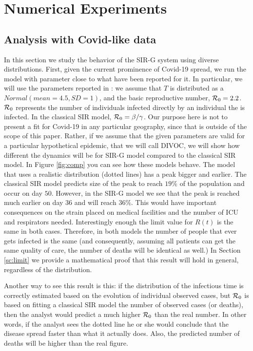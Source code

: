\documentclass[USenglish,10pt]{article}
\newcommand{\Ro}{\ensuremath\mathcal{R}_0\xspace}
\begin{document}
\section{Numerical Experiments}\label{sc:numerical}

\subsection{Analysis with Covid-like data}

In this section we study the behavior of the SIR-G system using diverse distributions.
First, given the current prominence of Covid-19 spread, we run the model with parameter close to what have been reported for it. In particular, we will use the parameters reported in \cite{lour.ea20}: we assume that $T$ is distributed as a $Normal(mean=4.5, SD=1)$, and the basic reproductive number, $\Ro=2.2$.
$\Ro$ represents the number of individuals infected directly by an individual the is infected. In the classical SIR model, $\Ro=\beta/\gamma$.
Our purpose here is not to present a fit for Covid-19 in any particular geography, since that is outside of the scope of this paper.
Rather, if we assume that the given parameters are valid for a particular hypothetical epidemic, that we will call DIVOC, we will show how different the dynamics will be for SIR-G model compared to the classical SIR model.
In Figure \ref{fig:comp} you can see how these models behave. The model that uses a realistic distribution (dotted lines) has a peak bigger and earlier. The classical SIR model predicts size of the peak to reach $19\%$ of the population and occur on day $50$.
However, in the SIR-G model we see that the peak is reached much earlier on day $36$ and will reach $36\%$. This would have important consequences on the strain placed on medical facilities and the number of ICU and respirators needed.
Interestingly enough the limit value for $R(t)$ is the same in both cases. Therefore, in both models the number of people that ever gets infected is the same (and consequently, assuming all patients can get the same quality of care, the number of deaths will be identical as well.) In Section \ref{sc:limit} we provide a mathematical proof that this result will hold in general, regardless of the distribution.

Another way to see this result is this: if the distribution of the infectious time is correctly estimated based on the evolution of individual observed cases, but $\Ro$ is based on fitting a classical SIR model the number of observed cases (or deaths), then the analyst would predict a much higher $\Ro$ than the real number. In other words, if the analyst sees the dotted line he or she would conclude that the disease spread faster than what it actually does. Also, the predicted number of deaths will be higher than the real figure.
\end{document}

